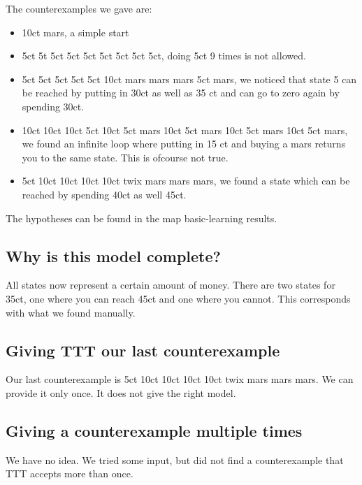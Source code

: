 \documentclass[11pt,a4paper]{article}
\begin{document}
The counterexamples we gave are:
\begin{itemize}
	\item 10ct mars, a simple start
	\item 5ct 5t 5ct 5ct 5ct 5ct 5ct 5ct 5ct, doing 5ct 9 times is not allowed.
	\item 5ct 5ct 5ct 5ct 5ct 10ct mars mars mars 5ct mars, we noticed that state 5 can be reached by putting in 30ct as well as 35 ct and can go to zero again by spending 30ct.
	\item 10ct 10ct 10ct 5ct 10ct 5ct mars 10ct 5ct mars 10ct 5ct mars 10ct 5ct mars, we found an infinite loop where putting in 15 ct and buying a mars returns you to the same state. This is ofcourse not true.
	\item 5ct 10ct 10ct 10ct 10ct twix mars mars mars, we found a state which can be reached by spending 40ct as well 45ct. 
\end{itemize}

The hypotheses can be found in the map basic-learning results.

\subsection{Why is this model complete?}
All states now represent a certain amount of money. There are two states for 35ct, one where you can reach 45ct and one where you cannot. This corresponds with what we found manually.




\subsection{Giving TTT our last counterexample}
Our last counterexample is 5ct 10ct 10ct 10ct 10ct twix mars mars mars. We can provide it only once. It does not give the right model.

\subsection{Giving a counterexample multiple times}
We have no idea. We tried some input, but did not find a counterexample that TTT accepts more than once.
\end{document}
